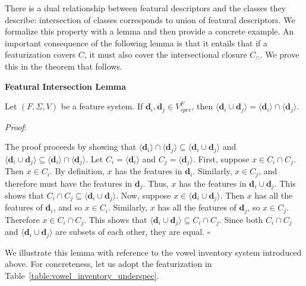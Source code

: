 \documentclass[12pt, oneside]{article}   	%
\newenvironment{clump}
{
	\edef\myindent{\the\parindent}
	\noindent\begin{minipage}{\textwidth}
	\setlength\parindent{\myindent}\fussy
}
{
	\end{minipage}
}
\begin{document}
There is a dual relationship between featural descriptors and the classes they describe: intersection of classes corresponds to union of featural descriptors. We formalize this property with a lemma and then provide a concrete example. An important consequence of the following lemma is that it entails that if a featurization covers $C$, it must also cover the intersectional closure $C_\cap$. We prove this in the theorem that follows.

\begin{clump}
\vspace{\baselineskip} \noindent \textbf{Featural Intersection Lemma}

\indent Let $(F, \Sigma, V)$ be a feature system. If $\mathbf{d}_i, \mathbf{d}_j \in V_{spec}^F$, then $\langle \mathbf{d}_i \cup \mathbf{d}_j \rangle =  \langle \mathbf{d}_i \rangle \cap \langle \mathbf{d}_j \rangle$.
\end{clump}

\noindent \textit{Proof}:

The proof proceeds by showing that $ \langle \mathbf{d}_i \rangle \cap \langle \mathbf{d}_j \rangle \subseteq \langle \mathbf{d}_i \cup \mathbf{d}_j \rangle$ and $\langle \mathbf{d}_i \cup \mathbf{d}_j \rangle \subseteq \langle \mathbf{d}_i \rangle \cap \langle \mathbf{d}_j \rangle$.
Let $C_i = \langle \mathbf{d}_i \rangle$ and $C_j = \langle \mathbf{d}_j \rangle$.
First, suppose $x \in C_i \cap C_j$. Then $x \in C_i$. By definition, $x$ has the features in $\mathbf{d}_i$.
Similarly, $x \in C_j$, and therefore must have the features in $\mathbf{d}_j$.
Thus, $x$ has the features in $\mathbf{d}_i \cup \mathbf{d}_j$. This shows that $C_i \cap C_j \subseteq \langle \mathbf{d}_i \cup \mathbf{d}_j \rangle$.
Now, suppose $x \in \langle \mathbf{d}_i \cup \mathbf{d}_j \rangle$. Then $x$ has all the features of $\mathbf{d}_i$, and so $x \in C_i$.
Similarly, $x$ has all the features of $\mathbf{d}_j$, so $x \in C_j$. Therefore $x \in C_i \cap C_j$. This shows that $\langle \mathbf{d}_i \cup \mathbf{d}_j \rangle \subseteq C_i \cap C_j$.
Since both $C_i \cap C_j$ and $\langle \mathbf{d}_i \cup \mathbf{d}_j \rangle$ are subsets of each other, they are equal.
$\square$

\vspace{0.5\baselineskip} We illustrate this lemma with reference to the vowel inventory system introduced above. For concreteness, let us adopt the featurization in Table~\ref{table:vowel_inventory_underspec}.
\end{document}
